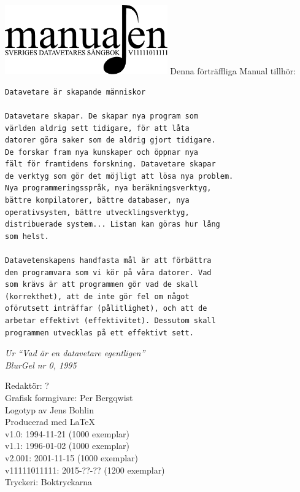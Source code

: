 \documentclass[a6paper,fontsize=10pt,twoside,open=right]{scrbook}
\begin{document}
\setlength{\parindent}{0pt}
\vspace*{6.5cm}
\hspace*{0.9cm}
\includegraphics[keepaspectratio,width=7cm]{elements/logo.pdf}
\clearpage
\noindent Denna förträffliga Manual tillhör:
\ohead{\textnormal{\textsc{\scriptsize\leftmark}}}
\ofoot[\pagemark]{\textsc{\scriptsize\pagemark}}
\clearpage
{\small\begin{verbatim}
Datavetare är skapande människor

Datavetare skapar. De skapar nya program som
världen aldrig sett tidigare, för att låta
datorer göra saker som de aldrig gjort tidigare.
De forskar fram nya kunskaper och öppnar nya
fält för framtidens forskning. Datavetare skapar
de verktyg som gör det möjligt att lösa nya problem.
Nya programmeringsspråk, nya beräkningsverktyg,
bättre kompilatorer, bättre databaser, nya
operativsystem, bättre utvecklingsverktyg,
distribuerade system... Listan kan göras hur lång
som helst.
  
Datavetenskapens handfasta mål är att förbättra
den programvara som vi kör på våra datorer. Vad
som krävs är att programmen gör vad de skall
(korrekthet), att de inte gör fel om något
oförutsett inträffar (pålitlighet), och att de
arbetar effektivt (effektivitet). Dessutom skall
programmen utvecklas på ett effektivt sett.
\end{verbatim}}
\vspace{10pt}
{\footnotesize\textit{Ur ``Vad är en datavetare
egentligen''\\ BlurGel nr 0, 1995}}
\clearpage
\setlength{\parindent}{15pt}
\null
\vfill
    {\noindent\small\centering
      Redaktör: ?\\
      Grafisk formgivare: Per Bergqwist\\
      Logotyp av Jens Bohlin\\
      Producerad med \LaTeX\\
      v1.0: 1994-11-21 (1000 exemplar)\\
      v1.1: 1996-01-02 (1000 exemplar)\\
      v2.001: 2001-11-15 (1000 exemplar)\\
      v11111011111: 2015-??-?? (1200 exemplar)\\
      Tryckeri: Boktryckarna\par
    }
\cleardoublepage
\end{document}
